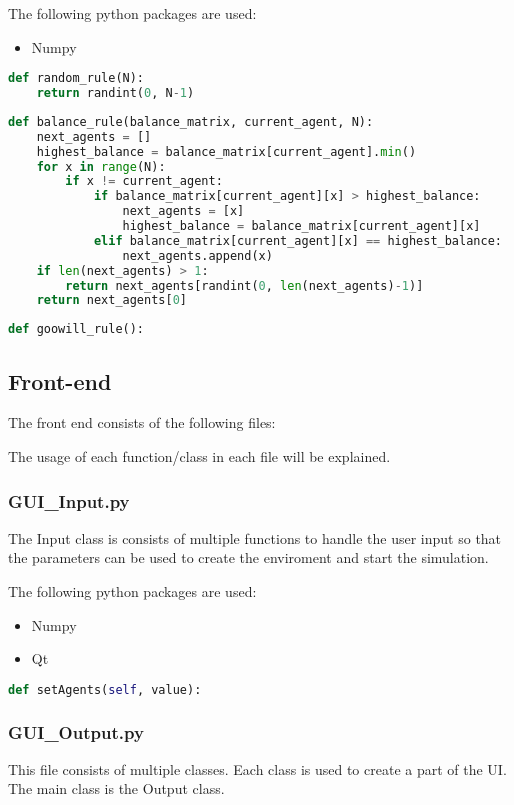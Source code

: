\documentclass{article}
\begin{document}
The following python packages are used:
\begin{itemize}
  \item Numpy
\end{itemize}

\begin{lstlisting}[language=Python]
def random_rule(N):
	return randint(0, N-1)
\end{lstlisting}

\begin{lstlisting}[language=Python]
def balance_rule(balance_matrix, current_agent, N):
	next_agents = []
	highest_balance = balance_matrix[current_agent].min()
	for x in range(N):
		if x != current_agent:
			if balance_matrix[current_agent][x] > highest_balance:
				next_agents = [x]
				highest_balance = balance_matrix[current_agent][x]
			elif balance_matrix[current_agent][x] == highest_balance:
				next_agents.append(x)
	if len(next_agents) > 1:
		return next_agents[randint(0, len(next_agents)-1)]
	return next_agents[0]
\end{lstlisting}

\begin{lstlisting}[language=Python]
def goowill_rule():
\end{lstlisting}

\subsection{Front-end}
The front end consists of the following files:

The usage of each function/class in each file will be explained.
\subsubsection{GUI\_Input.py}
The Input class is consists of multiple functions to handle the user input so that the parameters can be used to create the enviroment and start the simulation.

The following python packages are used:
\begin{itemize}
  \item Numpy
  \item Qt
\end{itemize}

\begin{lstlisting}[language=Python]
def setAgents(self, value):
\end{lstlisting}

\subsubsection{GUI\_Output.py}
This file consists of multiple classes. Each class is used to create a part of the UI. The main class is the Output class.
\end{document}
